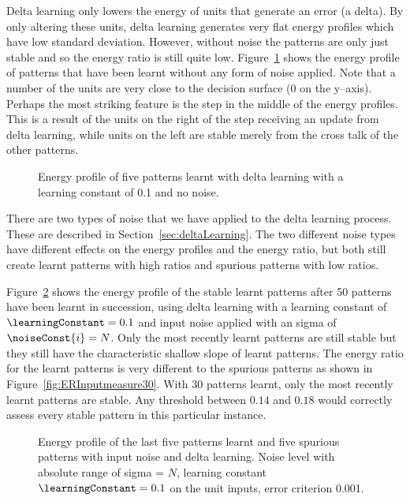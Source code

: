 Delta learning only lowers the energy of units that generate an error (a delta).  By only altering these units, delta learning generates very flat energy profiles which have low standard deviation. However, without noise the patterns are only just stable and so the energy ratio is still quite low.  Figure~\ref{fig:deltaNoNoiseEP} shows the energy profile of patterns that have been learnt without any form of noise applied.  Note that a number of the units are very close to the decision surface (0 on the y--axis).  Perhaps the most striking feature is the step in the middle of the energy profiles.  This is a result of the units on the right of the step receiving an update from delta learning, while units on the left are stable merely from the cross talk of the other patterns.

\begin{figure}[tbp]
	\center
	\small
		
	\caption{Energy profile of five patterns learnt with delta learning with a learning constant of 0.1 and no noise.}
	\label{fig:deltaNoNoiseEP}
\end{figure}


There are two types of noise that we have applied to the delta learning process.  These are described in Section~\ref{sec:deltaLearning}.  The two different noise types have different effects on the energy profiles and the energy ratio, but both still create learnt patterns with high ratios and spurious patterns with low ratios. 

Figure~\ref{fig:EPDeltaInput50} shows the energy profile of the stable learnt patterns after 50 patterns have been learnt in succession, using delta learning with a learning constant of $\learningConstant = 0.1$ and input noise applied with an sigma of $\noiseConst{i} = N$. Only the most recently learnt patterns are still stable but they still have the characteristic shallow slope of learnt patterns.  The energy ratio for the learnt patterns is very different to the spurious patterns as shown in Figure~\ref{fig:ERInputmeasure30}.  With 30 patterns learnt, only the most recently learnt patterns are stable.  Any threshold between $0.14$ and $0.18$ would correctly assess every stable pattern in this particular instance.    


\begin{figure}[tbp]
	\center
	\small
		
	\caption{Energy profile of the last five patterns learnt and five spurious patterns with input noise and delta learning.  Noise level with absolute range of sigma = $N$, learning constant $\learningConstant =0.1$  on the unit inputs, error criterion 0.001.}
	\label{fig:EPDeltaInput50}
\end{figure} 

